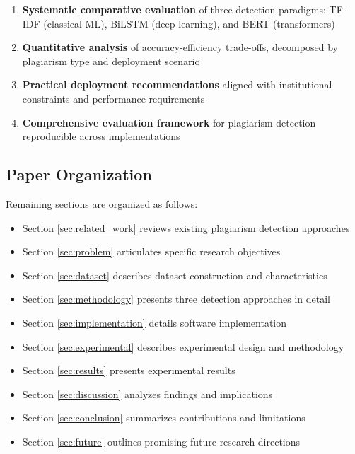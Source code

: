\begin{enumerate}
  \item \textbf{Systematic comparative evaluation} of three detection paradigms: TF-IDF (classical ML), BiLSTM (deep learning), and BERT (transformers)
  
  \item \textbf{Quantitative analysis} of accuracy-efficiency trade-offs, decomposed by plagiarism type and deployment scenario
  
  \item \textbf{Practical deployment recommendations} aligned with institutional constraints and performance requirements
  
  \item \textbf{Comprehensive evaluation framework} for plagiarism detection reproducible across implementations
\end{enumerate}

\subsection{Paper Organization}

Remaining sections are organized as follows:
\begin{itemize}
  \item Section \ref{sec:related_work} reviews existing plagiarism detection approaches
  \item Section \ref{sec:problem} articulates specific research objectives
  \item Section \ref{sec:dataset} describes dataset construction and characteristics
  \item Section \ref{sec:methodology} presents three detection approaches in detail
  \item Section \ref{sec:implementation} details software implementation
  \item Section \ref{sec:experimental} describes experimental design and methodology
  \item Section \ref{sec:results} presents experimental results
  \item Section \ref{sec:discussion} analyzes findings and implications
  \item Section \ref{sec:conclusion} summarizes contributions and limitations
  \item Section \ref{sec:future} outlines promising future research directions
\end{itemize}
